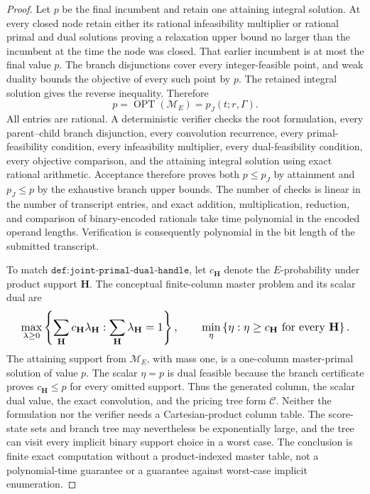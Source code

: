 \documentclass{article}
\begin{document}
\begin{proof}
Let \(p\) be the final incumbent and retain one attaining integral solution. At every closed node retain either its rational infeasibility multiplier or rational primal and dual solutions proving a relaxation upper bound no larger than the incumbent at the time the node was closed. That earlier incumbent is at most the final value \(p\). The branch disjunctions cover every integer-feasible point, and weak duality bounds the objective of every such point by \(p\). The retained integral solution gives the reverse inequality. Therefore
\[p=\operatorname{OPT}(\mathcal M_E)=p_J(t;r,\Gamma).\]
All entries are rational. A deterministic verifier checks the root formulation, every parent--child branch disjunction, every convolution recurrence, every primal-feasibility condition, every infeasibility multiplier, every dual-feasibility condition, every objective comparison, and the attaining integral solution using exact rational arithmetic. Acceptance therefore proves both \(p\le p_J\) by attainment and \(p_J\le p\) by the exhaustive branch upper bounds. The number of checks is linear in the number of transcript entries, and exact addition, multiplication, reduction, and comparison of binary-encoded rationals take time polynomial in the encoded operand lengths. Verification is consequently polynomial in the bit length of the submitted transcript.

To match \(\texttt{def:joint-primal-dual-handle}\), let \(c_{\mathbf H}\) denote the \(E\)-probability under product support \(\mathbf H\). The conceptual finite-column master problem and its scalar dual are
\[
\makebox[\linewidth][c]{\resizebox{0.98\linewidth}{!}{\par\noindent \makebox[\linewidth][c]{\resizebox{0.98\linewidth}{!}{\(\displaystyle \displaystyle \max_{\lambda\ge0}\left\{\sum_{\mathbf H}c_{\mathbf H}\lambda_{\mathbf H}:\sum_{\mathbf H}\lambda_{\mathbf H}=1\right\},\qquad \min_{\eta}\left\{\eta:\eta\ge c_{\mathbf H}\text{ for every }\mathbf H\right\}.\)}}\par\noindent}}
\]
The attaining support from \(\mathcal M_E\), with mass one, is a one-column master-primal solution of value \(p\). The scalar \(\eta=p\) is dual feasible because the branch certificate proves \(c_{\mathbf H}\le p\) for every omitted support. Thus the generated column, the scalar dual value, the exact convolution, and the pricing tree form \(\mathcal C\). Neither the formulation nor the verifier needs a Cartesian-product column table. The score-state sets and branch tree may nevertheless be exponentially large, and the tree can visit every implicit binary support choice in a worst case. The conclusion is finite exact computation without a product-indexed master table, not a polynomial-time guarantee or a guarantee against worst-case implicit enumeration.


\end{proof}
\end{document}
